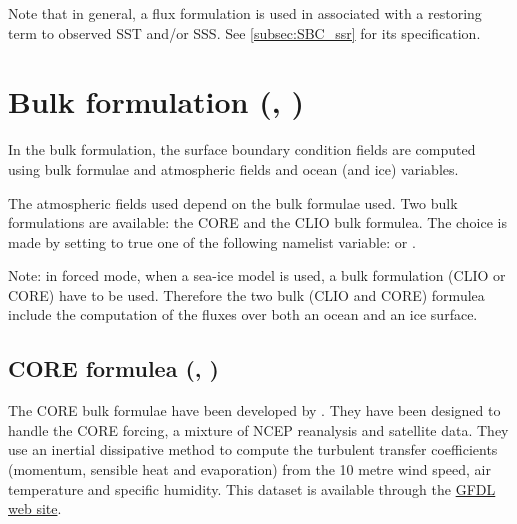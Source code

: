 \documentclass[../tex_main/NEMO_manual]{subfiles}
\begin{document}
Note that in general, a flux formulation is used in associated with a restoring term to observed SST and/or SSS.
See \autoref{subsec:SBC_ssr} for its specification.


\section[Bulk formulation {(\textit{sbcblk\{\_core,\_clio\}.F90})}]
                        {Bulk formulation {(\protect{}, \protect{})}}
\label{sec:SBC_blk}

In the bulk formulation, the surface boundary condition fields are computed using bulk formulae and atmospheric fields and ocean (and ice) variables.

The atmospheric fields used depend on the bulk formulae used.
Two bulk formulations are available:
the CORE and the CLIO bulk formulea.
The choice is made by setting to true one of the following namelist variable:
 or .

Note:
in forced mode, when a sea-ice model is used, a bulk formulation (CLIO or CORE) have to be used.
Therefore the two bulk (CLIO and CORE) formulea include the computation of the fluxes over
both an ocean and an ice surface. 

\subsection{CORE formulea (\protect{}, \protect{})}
\label{subsec:SBC_blk_core}
%

The CORE bulk formulae have been developed by \citet{Large_Yeager_Rep04}.
They have been designed to handle the CORE forcing, a mixture of NCEP reanalysis and satellite data.
They use an inertial dissipative method to compute the turbulent transfer coefficients
(momentum, sensible heat and evaporation) from the 10 metre wind speed, air temperature and specific humidity.
This \citet{Large_Yeager_Rep04} dataset is available through
the \href{http://nomads.gfdl.noaa.gov/nomads/forms/mom4/CORE.html}{GFDL web site}.
\end{document}
